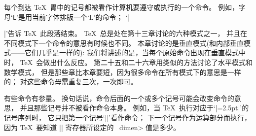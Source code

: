 每个到达 \TeX\ 胃中的记号都被看作计算机要遵守或执行的一个{命令}。%
例如，字母`{\tt L}'是用当前字体排版一个`L'的命令；
`|\par|'告诉 \TeX\ 此段落结束。%
 \TeX\ 总是处在第十三章讨论的六种模式之一，
并且在不同模式下一个命令的意思有时候也不同。%
本章讨论的是垂直模式(和内部垂直模式——它们几乎是一样的):
我们将讲述的是，当每个原始命令出现在垂直模式中时， \TeX\ 会做出什么反应。%
第二十五和二十六章用类似的方法讨论了水平模式和数学模式，
但是那些章比本章要短，因为很多命令在所有模式下的意思是一样的；
对这些命令毋需重复三次，一次即可。

\1有些命令有参量。%
换句话说，命令后面的一个或多个记号可能会改变命令的意思，
并且那些记号并不被看作命令本身。%
例如，当 \TeX\ 执行对应于`|=2.5pt|'的记号序列时，
它只把第一个记号`|\dimen|'看作命令；
下一个记号作为运算部分而执行，因为 \TeX\ 要知道 |\dimen| 寄存器所设定的%
~\<dimen> 值是多少。


